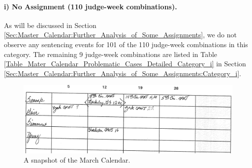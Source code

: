 \documentclass[11pt, oneside]{article}   	%
\theoremstyle{ModifiedStyle}
\begin{document}
		\vspace{-3mm}
		\paragraph{i) No Assignment (110 judge-week combinations).}
		\label{Category_i}
		As will be discussed in Section \ref{Sec:Master_Calendar:Further_Analysis_of_Some_Assignments}, we do not observe any sentencing events for 101 of the 110 judge-week combinations in this category. The remaining 9 judge-week combinations are listed in Table \ref{Table_Mater_Calendar_Problematic_Cases_Detailed_Category_i} in Section \ref{Sec:Master_Calendar:Further_Analysis_of_Some_Assignments:Category_i}.

		\begin{figure}[H]
			\centering
			\vspace{-0mm}
			\includegraphics[scale=0.097]{Figures/Fig2}
			\caption{A snapshot of the March Calendar.}
			\label{Figure_Master_Calendar_1}
		\end{figure}

		\vspace{-3mm}
\end{document}
